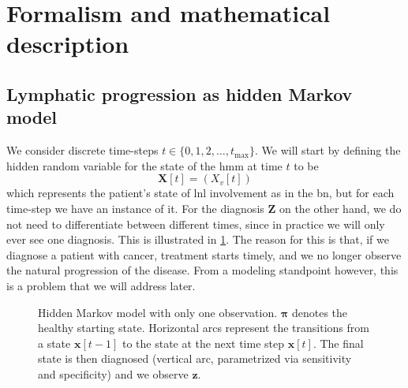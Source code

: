 \documentclass[\relativeRoot/main.tex]{subfiles}
\begin{document}
\section{Formalism and mathematical description}
\label{sec:unilateral:formalism}

\subsection{Lymphatic progression as hidden Markov model}
\label{subsec:unilateral:formalism:spread_as_hmm}

We consider discrete time-steps $t \in \{ 0, 1, 2, \ldots, t_\text{max} \}$. We will start by defining the hidden random variable for the state of the \gls{hmm} at time $t$ to be
%
\begin{equation}
    \mathbf{X}[t] = \left( X_v[t] \right)
\end{equation}
%
which represents the patient's state of \gls{lnl} involvement as in the \gls{bn}, but for each time-step we have an instance of it. For the diagnosis $\mathbf{Z}$ on the other hand, we do not need to differentiate between different times, since in practice we will only ever see one diagnosis. This is illustrated in \cref{fig:unilateral:hmm_schema}. The reason for this is that, if we diagnose a patient with cancer, treatment starts timely, and we no longer observe the natural progression of the disease. From a modeling standpoint however, this is a problem that we will address later.

\begin{figure}[h]
    \centering
    \def\svgwidth{0.65\textwidth}
    
    \caption[Schema of how the HMM starts healthy and gets diagnosed eventually]{Hidden Markov model with only one observation. $\boldsymbol{\pi}$ denotes the healthy starting state. Horizontal arcs represent the transitions from a state $\mathbf{x}[t-1]$ to the state at the next time step $\mathbf{x}[t]$. The final state is then diagnosed (vertical arc, parametrized via sensitivity and specificity) and we observe $\mathbf{z}$.}
    \label{fig:unilateral:hmm_schema}
\end{figure}
\end{document}
